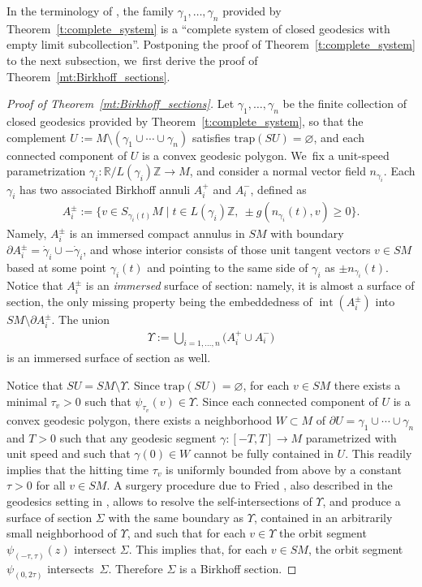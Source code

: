 \documentclass[JEP,XML,SOM,Unicode,NoFloatCountersInSection,published]{cedram}
\let\sep\mid
\newcommand{\Z}{\mathbb{Z}}
\newcommand{\R}{\mathbb{R}}
\newcommand{\trap}{\mathrm{trap}}
\DeclareMathOperator{\interior}{int}
\theoremstyle{plain}
\theoremstyle{definition}
\begin{document}
In the terminology of \cite[\S 4.2]{Contreras:2022ab}, the family $\gamma_1,\dots,\gamma_n$ provided by Theorem~\ref{t:complete_system} is a ``complete system of closed geodesics with empty limit subcollection''. Postponing the proof of Theorem~\ref{t:complete_system} to the next subsection, we~first derive the proof of Theorem~\ref{mt:Birkhoff_sections}.

\begin{proof}[Proof of Theorem~\ref{mt:Birkhoff_sections}]
Let $\gamma_1,\dots,\gamma_n$ be the finite collection of closed geodesics provided by Theorem~\ref{t:complete_system}, so that the complement $U:=M\setminus(\gamma_1\cup\cdots\cup\gamma_n)$ satisfies $\trap(SU)=\varnothing$, and each connected component of $U$ is a convex geodesic polygon. We~fix a unit-speed parametrization $\gamma_i:\R/L(\gamma_i)\Z\to M$, and consider a normal vector field $n_{\gamma_i}$. Each $\gamma_i$ has two associated Birkhoff annuli $A_i^+$ and $A_i^-$, defined as
\begin{align*}
A_i^\pm:=\big\{ v\in S_{\gamma_i(t)}M\sep t\in L(\gamma_i)\Z,\ \pm g(n_{\gamma_i}(t),v)\geq0\big\}.
\end{align*}
Namely, $A_i^\pm$ is an immersed compact annulus in $SM$ with boundary $\partial A_i^\pm=\dot\gamma_i\cup-\dot\gamma_i$, and whose interior consists of those unit tangent vectors $v\in SM$ based at some point $\gamma_i(t)$ and pointing to the same side of $\gamma_i$ as $\pm n_{\gamma_i}(t)$. Notice that $A_i^\pm$ is an \emph{immersed} surface of section: namely, it is almost a surface of section, the only missing property being the embeddedness of $\interior(A_i^\pm)$ into $SM\setminus\partial A_i^\pm$. The union
\begin{align*}
\Upsilon:=\bigcup_{i=1,\dots,n} \big(A_i^+ \cup A_i^-\big)
\end{align*}
is an immersed surface of section as well.

Notice that $SU=SM\setminus\Upsilon$. Since $\trap(SU)=\varnothing$, for each $v\in SM$ there exists a minimal $\tau_v>0$ such that $\psi_{\tau_v}(v)\in\Upsilon$. Since each connected component of $U$ is a convex geodesic polygon, there exists a neighborhood $W\subset M$ of $\partial U=\gamma_1\cup\cdots\cup\gamma_n$ and $T>0$ such that any geodesic segment $\gamma:[-T,T]\to M$ parametrized with unit speed and such that $\gamma(0)\in W$ cannot be fully contained in $U$. This readily implies that the hitting time $\tau_v$ is uniformly bounded from above by a constant $\tau>0$ for all $v\in SM$. A surgery procedure due to Fried \cite{Fried:1983aa}, also described in the geodesics setting in \cite[\S 4.1]{Contreras:2022ab}, allows to resolve the self-intersections of $\Upsilon$, and produce a surface of section $\Sigma$ with the same boundary as $\Upsilon$, contained in an arbitrarily small neighborhood of $\Upsilon$, and such that for each $v\in\Upsilon$ the orbit segment $\psi_{(-\tau,\tau)}(z)$ intersect $\Sigma$. This implies that, for each $v\in SM$, the orbit segment $\psi_{(0,2\tau)}$ intersects~$\Sigma$. Therefore $\Sigma$ is a Birkhoff section.
\end{proof}
\end{document}
